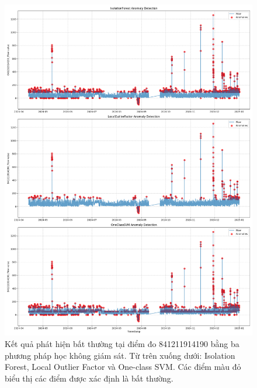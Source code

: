 \begin{figure}[H]
    \centering
    \includegraphics[width=\textwidth]{image/section6_1/anomalies_subplots_841211914190.png}
    \caption{Kết quả phát hiện bất thường tại điểm đo 841211914190 bằng ba phương pháp học không giám sát. Từ trên xuống dưới: Isolation Forest, Local Outlier Factor và One-class SVM. Các điểm màu đỏ biểu thị các điểm được xác định là bất thường.}
    \label{fig:anomaly_subplots_841211914190}
\end{figure}

